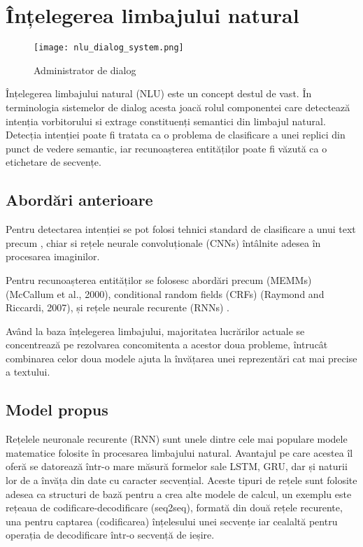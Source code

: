\section{Înțelegerea limbajului natural}
\begin{figure}[h]
	\centering
	\texttt{[image: nlu\_dialog\_system.png]}
	\caption{Administrator de dialog}
	\label{fig:nlu_ds_proc}
\end{figure}
Înțelegerea limbajului natural (NLU) este un concept destul de vast. În terminologia sistemelor de dialog acesta joacă rolul componentei care detectează intenția vorbitorului si extrage constituenți semantici din limbajul natural.
Detecția intenției poate fi tratata ca o problema de clasificare a unei replici din punct de vedere semantic, iar recunoașterea entităților poate fi văzută ca o etichetare de secvențe.
\subsection{Abordări anterioare}

Pentru detectarea intenției se pot folosi tehnici standard de clasificare a unui text precum \cite{recursive-nn-intent, boosting-intent, boostingplus-intent, att_joint_bing}, chiar si rețele neurale convoluționale (CNNs) \cite{sarika-cnn-crf} întâlnite adesea în procesarea imaginilor.

Pentru recunoașterea entităților se folosesc abordări precum (MEMMs) (McCallum et al., 2000), conditional random fields (CRFs) (Raymond and Riccardi, 2007), și rețele neurale recurente (RNNs) \cite{mesnil-rnn-crf, rnn-em, deep-lstm}.

Având la baza înțelegerea limbajului, majoritatea lucrărilor actuale se concentrează pe rezolvarea concomitenta a acestor doua probleme, întrucât combinarea celor doua modele ajuta la învățarea unei reprezentări cat mai precise a textului. \cite{recursive-nn-intent, att_joint_bing, joint_online_bing, bi-model}


\subsection{Model propus}

Rețelele neuronale recurente (RNN) sunt unele dintre cele mai populare modele matematice folosite în procesarea limbajului natural. Avantajul pe care acestea îl oferă se datorează într-o mare măsură formelor sale LSTM, GRU, dar și naturii lor de a învăța din date cu caracter secvențial. Aceste tipuri de rețele sunt folosite adesea ca structuri de bază pentru a crea alte modele de calcul, un exemplu este rețeaua de codificare-decodificare (seq2seq), formată din două rețele recurente, una pentru captarea (codificarea) înțelesului unei secvențe iar cealaltă pentru operația de decodificare într-o secvență de ieșire.

